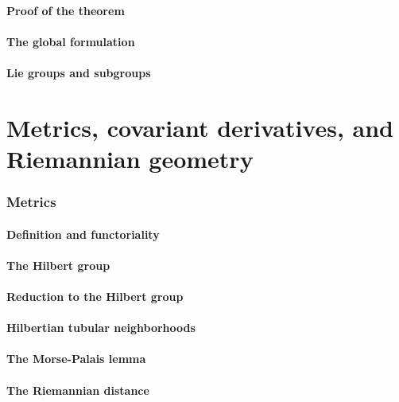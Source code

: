 \documentclass[a4paper]{article}
\begin{document}
\subsection{Proof of the theorem}

\subsection{The global formulation}

\subsection{Lie groups and subgroups}

\part{Metrics, covariant derivatives, and Riemannian geometry}

\section{Metrics}

\subsection{Definition and functoriality}

\subsection{The Hilbert group}

\subsection{Reduction to the Hilbert group}

\subsection{Hilbertian tubular neighborhoods}

\subsection{The Morse-Palais lemma}

\subsection{The Riemannian distance}
\end{document}
